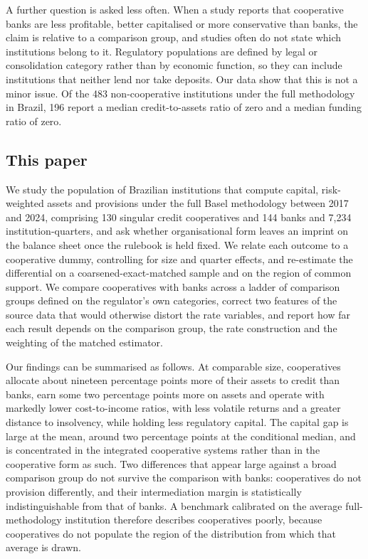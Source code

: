 \documentclass[11pt,a4paper]{article}
\begin{document}
A further question is asked less often. When a study reports that cooperative banks are
less profitable, better capitalised or more conservative than banks, the claim is
relative to a comparison group, and studies often do not state which institutions belong
to it. Regulatory populations are defined by legal or consolidation category rather than
by economic function, so they can include institutions that neither lend nor take
deposits. Our data show that this is not a minor issue. Of the 483 non-cooperative
institutions under the full methodology in Brazil, 196 report a median credit-to-assets
ratio of zero and a median funding ratio of zero.

\subsection{This paper}

We study the population of Brazilian institutions that compute capital, risk-weighted
assets and provisions under the full Basel methodology between 2017 and 2024, comprising
130 singular credit cooperatives and 144 banks and 7{,}234 institution-quarters, and ask
whether organisational form leaves an imprint on the balance sheet once the rulebook is
held fixed. We relate each outcome to a cooperative dummy, controlling for size and
quarter effects, and re-estimate the differential on a coarsened-exact-matched sample and
on the region of common support. We compare cooperatives with banks across a ladder of
comparison groups defined on the regulator's own categories, correct two features of the
source data that would otherwise distort the rate variables, and report how far each
result depends on the comparison group, the rate construction and the weighting of the
matched estimator.

Our findings can be summarised as follows. At comparable size, cooperatives allocate
about nineteen percentage points more of their assets to credit than banks, earn some two
percentage points more on assets and operate with markedly lower cost-to-income ratios,
with less volatile returns and a greater distance to insolvency, while holding less
regulatory capital. The capital gap is large at the mean, around two percentage points at
the conditional median, and is concentrated in the integrated cooperative systems rather
than in the cooperative form as such. Two differences that appear large against a broad
comparison group do not survive the comparison with banks: cooperatives do not provision
differently, and their intermediation margin is statistically indistinguishable from that
of banks. A benchmark calibrated on the average full-methodology institution therefore
describes cooperatives poorly, because cooperatives do not populate the region of the
distribution from which that average is drawn.
\end{document}
